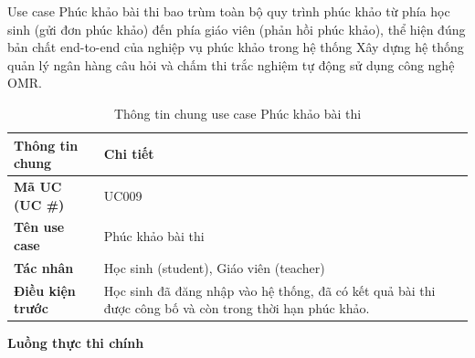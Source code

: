 ﻿\documentclass[../DoAn.tex]{subfiles}
\begin{document}
Use case Phúc khảo bài thi bao trùm toàn bộ quy trình phúc khảo từ phía học sinh (gửi đơn phúc khảo) đến phía giáo viên (phản hồi phúc khảo), thể hiện đúng bản chất end-to-end của nghiệp vụ phúc khảo trong hệ thống Xây dựng hệ thống quản lý ngân hàng câu hỏi và chấm thi trắc nghiệm tự động sử dụng công nghệ OMR.
\begin{table}[H]
\centering
\begin{tabular}{|p{4cm}|p{10cm}|}
\hline
\textbf{Thông tin chung} & \textbf{Chi tiết} \\ \hline
\textbf{Mã UC (UC \#)} & UC009 \\ \hline
\textbf{Tên use case} & Phúc khảo bài thi \\ \hline
\textbf{Tác nhân} & Học sinh (student), Giáo viên (teacher) \\ \hline
\textbf{Điều kiện trước} & Học sinh đã đăng nhập vào hệ thống, đã có kết quả bài thi được công bố và còn trong thời hạn phúc khảo. \\ \hline
\end{tabular}
\caption{Thông tin chung use case Phúc khảo bài thi}
\label{table:2.3.5_info}
\end{table}
\noindent\textbf{Luồng thực thi chính}
\end{document}
